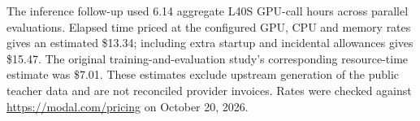 The inference follow-up used 6.14 aggregate L40S GPU-call hours across parallel evaluations. Elapsed time priced at the configured GPU, CPU and memory rates gives an estimated \$13.34; including extra startup and incidental allowances gives \$15.47. The original training-and-evaluation study's corresponding resource-time estimate was \$7.01. These estimates exclude upstream generation of the public teacher data and are not reconciled provider invoices. Rates were checked against \url{https://modal.com/pricing} on October 20, 2026.
